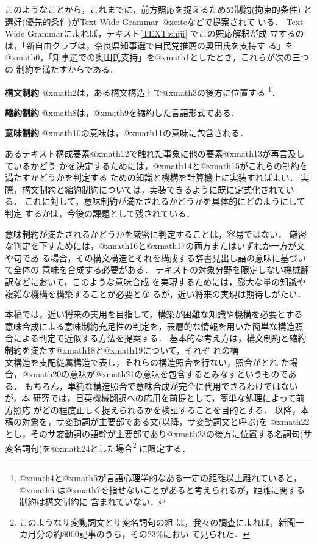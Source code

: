 このようなことから，これまでに，前方照応を捉えるための制約(拘束的条件)
と選好(優先的条件)がText-Wide Grammar~@xciteなどで提案されて
いる．
Text-Wide Grammarによれば，テキスト\ref{TEXT:shiji} でこの照応解釈が成
立するのは，「新自由クラブは，奈良県知事選で自民党推薦の奥田氏を支持す
る」を@xmath0，「知事選での奥田氏支持」を@xmath1としたとき，これらが次の三つの
制約を満たすからである．
\smallskip
\begin{LIST}
\item[\bf 構文制約] @xmath2は，ある構文構造上で@xmath3の後方に位置する
\footnote{@xmath4と@xmath5が言語心理学的なある一定の距離以上離れていると，@xmath6
は@xmath7を指せないことがあると考えられるが，距離に関する制約は構文制約に
含まれていない．}．
\item[\bf 縮約制約] @xmath8は，@xmath9を縮約した言語形式である．
\item[\bf 意味制約] @xmath10の意味は，@xmath11の意味に包含される．
\end{LIST}
\smallskip
あるテキスト構成要素@xmath12で触れた事象に他の要素@xmath13が再言及しているかどう
かを決定するためには，@xmath14と@xmath15がこれらの制約を満たすかどうかを判定する
ための知識と機構を計算機上に実装すればよい．
実際，構文制約と縮約制約については，実装できるように既に定式化されてい
る．
これに対して，意味制約が満たされるかどうかを具体的にどのようにして判定
するかは，今後の課題として残されている．

意味制約が満たされるかどうかを厳密に判定することは，容易ではない．
厳密な判定を下すためには，@xmath16と@xmath17の両方またはいずれか一方が文や句であ
る場合，その構文構造とそれを構成する辞書見出し語の意味に基づいて全体の
意味を合成する必要がある．
テキストの対象分野を限定しない機械翻訳などにおいて，このような意味合成
を実現するためには，膨大な量の知識や複雑な機構を構築することが必要とな
るが，近い将来の実現は期待しがたい． 

本稿では，近い将来の実用を目指して，構築が困難な知識や機構を必要とする
意味合成による意味制約充足性の判定を，表層的な情報を用いた簡単な構造照
合による判定で近似する方法を提案する．
基本的な考え方は，構文制約と縮約制約を満たす@xmath18と@xmath19について，それぞ
れの構\\文構造を支配従属構造で表し，それらの構造照合を行ない，照合がとれ
た場合，@xmath20の意味が@xmath21の意味を包含するとみなすというものである．
もちろん，単純な構造照合で意味合成が完全に代用できるわけではないが，本
研究では，日英機械翻訳への応用を前提として，簡単な処理によって前方照応
がどの程度正しく捉えられるかを検証することを目的とする．
以降，本稿の対象を，サ変動詞が主要部である文(以降，サ変動詞文と呼ぶ)を
@xmath22とし，そのサ変動詞の語幹が主要部であり@xmath23の後方に位置する名詞句(サ
変名詞句)を@xmath24とした場合\footnote{このようなサ変動詞文とサ変名詞句の組
は，我々の調査によれば，新聞一カ月分の約8000記事のうち，その23\%におい
て見られた．}
に限定する．

